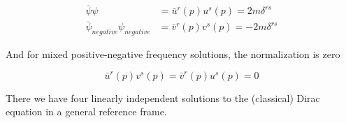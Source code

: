 \begin{align}
\bar{\psi} \psi &= \bar{u}^r (p) u^s (p) = 2 m \delta^{rs} \\
\bar{\psi}_{negative} \psi_{negative} &= \bar{v}^r (p) v^s (p) = -2 m \delta^{rs}
\end{align}

\noindent And for mixed positive-negative frequency solutions, the normalization is zero

\begin{equation}
\bar{u}^r(p) v^s (p) = \bar{v}^r (p) u^s (p) = 0
\end{equation}

\noindent There we have four linearly independent solutions to the (classical) Dirac equation in a general reference frame.